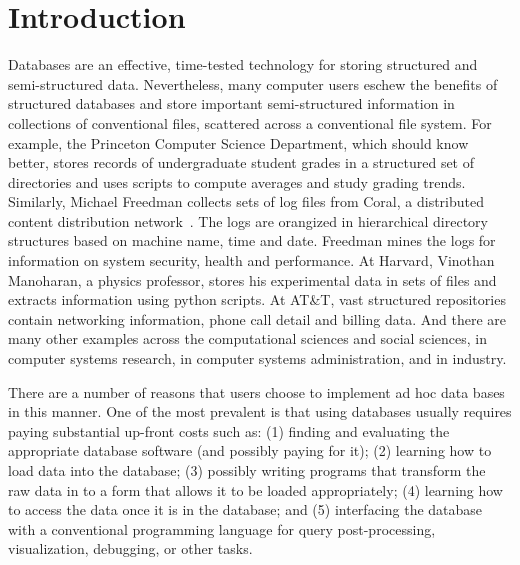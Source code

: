 \section {Introduction}
\label{sec:intro}

%
Databases are an effective, time-tested technology for storing
structured and semi-structured data.  Nevertheless, many computer
users eschew the benefits of structured databases and store important
semi-structured information in collections of conventional files,
scattered across a conventional file system.  For example, the
Princeton Computer Science Department, which should know better,
stores records of undergraduate student grades in a structured set of
directories and uses scripts to compute averages and
study grading trends.  Similarly, Michael Freedman collects
sets of log files from Coral, a distributed content distribution
network~\cite{freedman+:coral,freedman:coral-experience}.  
The logs are orangized in hierarchical
directory structures based on machine name, time and date.  Freedman
mines the logs for information on system security, health and performance.  At
Harvard, Vinothan Manoharan, a physics professor, stores 
his experimental data in sets of files and
extracts information using python scripts.  At AT\&T, vast structured
repositories contain networking information,
phone call detail and billing data.  And there are
many other examples across the computational sciences and social
sciences, in computer systems research, in computer
systems administration, and in industry.

There are a number of reasons that users
choose to implement ad hoc data bases in this manner.  One of the most 
prevalent
is that using databases usually requires paying substantial up-front 
costs such as: (1) finding and evaluating the
appropriate database
software (and possibly paying for it); (2) learning how to load data into
the database; (3) possibly writing programs that transform the raw
data in to a form that allows it to be loaded appropriately; 
(4) learning how to access the data once it is in the database; and 
(5) interfacing the database with a conventional programming language
for query post-processing, visualization, debugging, or other tasks.

